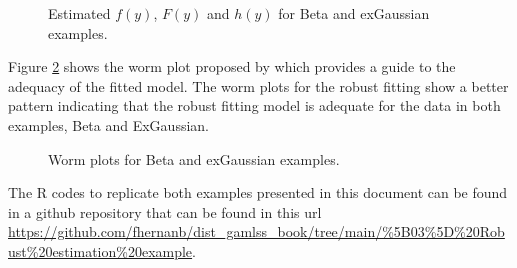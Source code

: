 \documentclass{article}
\begin{document}
\begin{figure}[htp]
\centering
{}
\caption{\label{3plots_both_examples} Estimated $f(y)$, $F(y)$ and $h(y)$ for Beta and exGaussian examples.}
\end{figure}

Figure \ref{wp_both_examples} shows the worm plot proposed by \cite{buuren2001worm} which provides a guide to the adequacy of the fitted model. The worm plots for the robust fitting show a better pattern indicating that the robust fitting model is adequate for the data in both examples, Beta and ExGaussian.

\begin{figure}[htp]
\centering
{}
\caption{\label{wp_both_examples} Worm plots for Beta and exGaussian examples.}
\end{figure}

The R codes to replicate both examples presented in this document can be found in a github repository that can be found in this url \url{https://github.com/fhernanb/dist_gamlss_book/tree/main/%5B03%5D%20Robust%20estimation%20example}.
    

\end{document}

